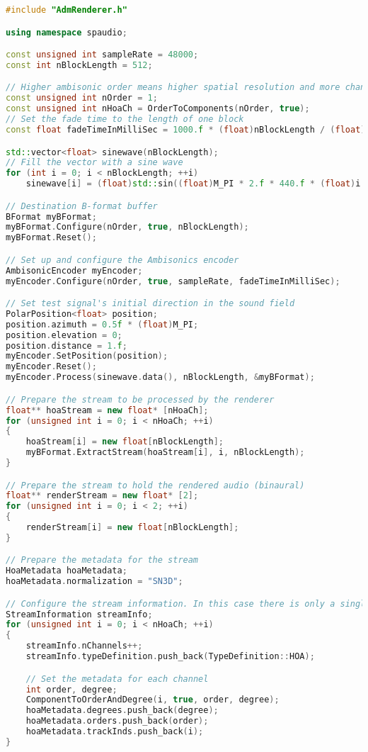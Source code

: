 \documentclass[12pt]{report}
\begin{document}
\begin{lstlisting}[language=C++]
#include "AdmRenderer.h"

using namespace spaudio;

const unsigned int sampleRate = 48000;
const int nBlockLength = 512;

// Higher ambisonic order means higher spatial resolution and more channels required
const unsigned int nOrder = 1;
const unsigned int nHoaCh = OrderToComponents(nOrder, true);
// Set the fade time to the length of one block
const float fadeTimeInMilliSec = 1000.f * (float)nBlockLength / (float)sampleRate;

std::vector<float> sinewave(nBlockLength);
// Fill the vector with a sine wave
for (int i = 0; i < nBlockLength; ++i)
    sinewave[i] = (float)std::sin((float)M_PI * 2.f * 440.f * (float)i / (float)sampleRate);

// Destination B-format buffer
BFormat myBFormat;
myBFormat.Configure(nOrder, true, nBlockLength);
myBFormat.Reset();

// Set up and configure the Ambisonics encoder
AmbisonicEncoder myEncoder;
myEncoder.Configure(nOrder, true, sampleRate, fadeTimeInMilliSec);

// Set test signal's initial direction in the sound field
PolarPosition<float> position;
position.azimuth = 0.5f * (float)M_PI;
position.elevation = 0;
position.distance = 1.f;
myEncoder.SetPosition(position);
myEncoder.Reset();
myEncoder.Process(sinewave.data(), nBlockLength, &myBFormat);

// Prepare the stream to be processed by the renderer
float** hoaStream = new float* [nHoaCh];
for (unsigned int i = 0; i < nHoaCh; ++i)
{
    hoaStream[i] = new float[nBlockLength];
    myBFormat.ExtractStream(hoaStream[i], i, nBlockLength);
}

// Prepare the stream to hold the rendered audio (binaural)
float** renderStream = new float* [2];
for (unsigned int i = 0; i < 2; ++i)
{
    renderStream[i] = new float[nBlockLength];
}

// Prepare the metadata for the stream
HoaMetadata hoaMetadata;
hoaMetadata.normalization = "SN3D";

// Configure the stream information. In this case there is only a single HOA stream of (nOrder + 1)^2 channels
StreamInformation streamInfo;
for (unsigned int i = 0; i < nHoaCh; ++i)
{
    streamInfo.nChannels++;
    streamInfo.typeDefinition.push_back(TypeDefinition::HOA);

    // Set the metadata for each channel
    int order, degree;
    ComponentToOrderAndDegree(i, true, order, degree);
    hoaMetadata.degrees.push_back(degree);
    hoaMetadata.orders.push_back(order);
    hoaMetadata.trackInds.push_back(i);
}


\end{lstlisting}
\end{document}
